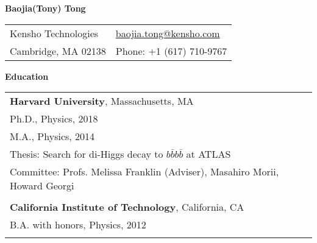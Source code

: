 \documentclass[letterpaper,11pt,oneside]{article}
\newcommand*{\Skype}{\href{skype:baojia.tong?add}{baojia.tong}}
\newcommand{\Absender}[1][\normalsize]{\Skype}
\newcommand{\blue}[1]{\textcolor[rgb]{0,0,0.9}{#1}}
\begin{document}

\noindent  \center \LARGE{\textbf{Baojia(Tony) Tong}}  \\
\vspace{1cm}
\normalsize
\begin{center}
\begin{tabular}{l l}
Kensho Technologies           & \hspace{1in} \href{mailto:baojia.tong@kensho.com}{baojia.tong@kensho.com} \\
 Cambridge, MA 02138     & \hspace{1in} Phone: +1 (617) 710-9767 \\
\end{tabular}
\end{center}
\noindent\makebox[\linewidth]{\rule{0.8\paperwidth}{1.5pt}}
\raggedright
\normalsize
\begin{flushleft}
\textbf{\Large{Education}} \\
\vspace{0.5cm}
 \begin{tabular}{@{} l}
     \textbf{Harvard University}, Massachusetts, MA \\
     Ph.D., Physics, 2018 \\
     M.A., Physics, 2014 \\
     Thesis: Search for di-Higgs decay to $b\bar{b}b\bar{b}$ at ATLAS \\
     Committee: Profs. Melissa Franklin (Adviser), Masahiro Morii, Howard Georgi \\
     \\
     \textbf{California Institute of Technology}, California, CA \\
     B.A. with honors, Physics, 2012 \\
     \\
 \end{tabular}
\end{flushleft}
\end{document}
